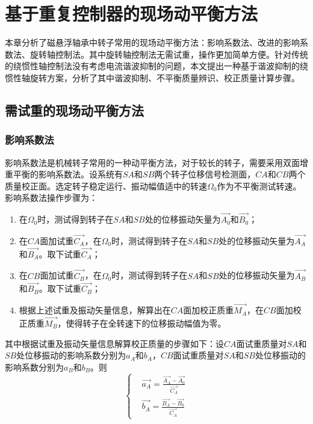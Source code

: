 \documentclass[
  lang=cn,
  degree=master,
  openany,oneside
]{nuaathesis}
\begin{document}
\chapter{基于重复控制器的现场动平衡方法}
本章分析了磁悬浮轴承中转子常用的现场动平衡方法：影响系数法、改进的影响系数法、旋转轴控制法。其中旋转轴控制法无需试重，操作更加简单方便。针对传统的绕惯性轴控制法没有考虑电流谐波抑制的问题，本文提出一种基于谐波抑制的绕惯性轴旋转方案，分析了其中谐波抑制、不平衡质量辨识、校正质量计算步骤。

\section{需试重的现场动平衡方法}

\subsection{影响系数法}

影响系数法是机械转子常用的一种动平衡方法，对于较长的转子，需要采用双面增重平衡的影响系数法。设系统有$SA$和$SB$两个转子位移信号检测面，$CA$和$CB$两个质量校正面。选定转子稳定运行、振动幅值适中的转速$\Omega _0$作为不平衡测试转速。影响系数法操作步骤为：
\begin{enumerate}
	\item 在$\Omega _0$时，测试得到转子在$SA$和$SB$处的位移振动矢量为${\overrightarrow{A_0}}$和${\overrightarrow{B_0}}$；
	\item 在$CA$面加试重${\overrightarrow{C_A}}$，在$\Omega _0$时，测试得到转子在$SA$和$SB$处的位移振动矢量为${\overrightarrow{A_A}}$和${\overrightarrow{B_A}}$。取下试重${\overrightarrow{C_A}}$；
	\item 在$CB$面加试重${\overrightarrow{C_B}}$，在$\Omega _0$时，测试得到转子在$SA$和$SB$处的位移振动矢量为${\overrightarrow{A_B}}$和${\overrightarrow{B_B}}$。取下试重${\overrightarrow{C_B}}$；
	\item 根据上述试重及振动矢量信息，解算出在$CA$面加校正质重${\overrightarrow{M_A}}$，在$CB$面加校正质重${\overrightarrow{M_B}}$，使得转子在全转速下的位移振动幅值为零。
\end{enumerate}

其中根据试重及振动矢量信息解算校正质量的步骤如下：设$CA$面试重质量对$SA$和$SB$处位移振动的影响系数分别为$a_A$和$b_A$，$CB$面试重质量对$SA$和$SB$处位移振动的影响系数分别为$a_B$和$b_B$。则
\begin{equation}
\left\{
\begin{aligned}
&	{\overrightarrow{a_A}} = \frac{{\overrightarrow{A_A}}-{\overrightarrow{A_0}}}{{\overrightarrow{C_A}}} \\
&		{\overrightarrow{b_A}} = \frac{{\overrightarrow{B_A}}-{\overrightarrow{B_0}}}{{\overrightarrow{C_A}}}
\end{aligned}
\right.
\end{equation}
\end{document}
